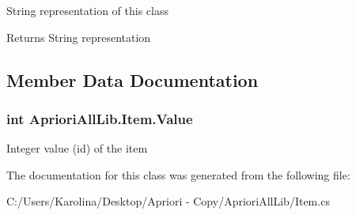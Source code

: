 String representation of this class 

\begin{DoxyReturn}{Returns}
String representation
\end{DoxyReturn}


\subsection{Member Data Documentation}
\hypertarget{class_apriori_all_lib_1_1_item_ab54b4b9529a99f74048264c3ed2ab6bd}{
\subsubsection[{Value}]{\setlength{\rightskip}{0pt plus 5cm}int Apriori\-All\-Lib.\-Item.\-Value}}\label{class_apriori_all_lib_1_1_item_ab54b4b9529a99f74048264c3ed2ab6bd}


Integer value (id) of the item 



The documentation for this class was generated from the following file\-:\begin{DoxyCompactItemize}
\item 
C\-:/\-Users/\-Karolina/\-Desktop/\-Apriori -\/ Copy/\-Apriori\-All\-Lib/Item.\-cs\end{DoxyCompactItemize}
